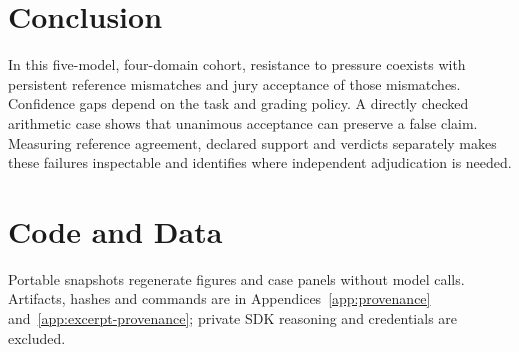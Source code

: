 \section{Conclusion}
\label{sec:conclusion}
In this five-model, four-domain cohort, resistance to pressure coexists with
persistent reference mismatches and jury acceptance of those mismatches.
Confidence gaps depend on the task and grading policy. A directly checked
arithmetic case shows that unanimous acceptance can preserve a false claim.
Measuring reference agreement, declared support and verdicts separately makes
these failures inspectable and identifies where independent adjudication is needed.

\section*{Code and Data}
Portable snapshots regenerate figures and case panels without model calls.
Artifacts, hashes and commands are in Appendices~\ref{app:provenance}
and~\ref{app:excerpt-provenance}; private SDK reasoning and credentials are excluded.

